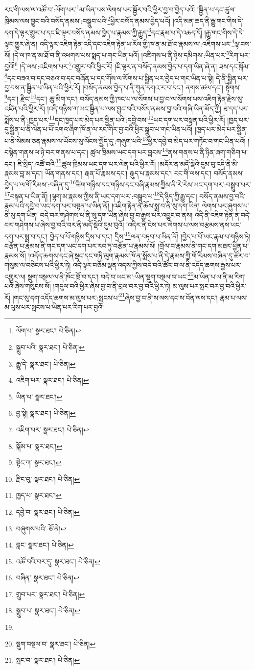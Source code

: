 རང་གི་ལས་ལ་འཚོ་བ་:ལོག་པར་\footnote{ལོག་པ་  སྣར་ཐང་།  པེ་ཅིན། }མ་ཡིན་པས་ལེགས་པར་སྦྱོར་བའི་ཕྱིར་བྱ་བ་བྱེད་པའོ། །སྦྱིན་པ་དང་ཚུལ་ཁྲིམས་ལས་བྱུང་བའི་བསོད་ནམས་:བསྒྲུབ་པའི་\footnote{སྒྲུབ་པའི་  སྣར་ཐང་།  པེ་ཅིན། }ཕྱིར་བསོད་ནམས་བྱེད་པའོ། །འདི་མན་ཆད་ནི་རྒྱུ་གང་གིས་དེ་དག་དེ་ལྟར་གྱུར་པ་དང་ཇི་ལྟར་བསོད་ནམས་བྱེད་པ་རྣམས་ཀྱི་རྒྱུད་\footnote{རྒྱུ་དེ་  སྣར་ཐང་།  པེ་ཅིན། }དང་རྣམ་པ་དེ་འཆད་དོ། །རྒྱུ་གང་གིས་དེ་དེ་ལྟར་གྱུར་ཞེ་ན། འདི་ལྟར་འཇིག་རྟེན་འདི་དང་འཇིག་རྟེན་ཕ་རོལ་གྱི་ཁ་ན་མ་ཐོ་བ་རྣམས་ལ་:འཇིགས་པར་\footnote{འཇིག་པར་  སྣར་ཐང་།  པེ་ཅིན། }ལྟ་བས་སོ། །དེ་ལ་ཁ་ན་མ་ཐོ་བ་ནི་འཕགས་པས་སྨད་པ་གང་ཡིན་པའོ། །འཇིགས་པ་ནི་ཉེས་དམིགས་:ཡིན་པར་\footnote{ཡིན་པ་  སྣར་ཐང་། }རིག་པར་བྱའོ།\footnote{བྱ་སྟེ།  སྣར་ཐང་།  པེ་ཅིན། } །དེ་ལས་:འཇིགས་པར་\footnote{འཇིག་པར་  སྣར་ཐང་།  པེ་ཅིན། }འགྱུར་བའི་ཕྱིར་རོ། །ཇི་ལྟར་ན་བསོད་ནམས་བྱེད་པ་དག་ཡིན་ཞེ་ན། ཟས་དང་སྐོམ་\footnote{སྐོམ་པ་  སྣར་ཐང་། }དང་བཟའ་བ་དང་བཅའ་བ་དང་བཞོན་པ་དང་གོས་ལ་སོགས་པ་སྦྱིན་པར་བྱེད་པ་གང་ཡིན་པ་སྟེ། དེ་ནི་སྦྱིན་པར་བྱ་བས་ན་སྦྱིན་པ་ཡིན་པའི་ཕྱིར་རོ། །བསོད་ནམས་བྱེད་པ་ནི་ཀུན་དགའ་ར་བ་དང་། ནགས་ཚལ་དང་། སྟེགས་\footnote{སྟེང་ཀ་  སྣར་ཐང་། }དང་། རྫིང་\footnote{རྫིང་བུ་  སྣར་ཐང་།  པེ་ཅིན། }དང་། ཆུ་མིག་དང་། བསོད་ནམས་ཀྱི་ཁང་པ་ལ་སོགས་པ་བྱ་བ་ལ་སོགས་པས་འཇིག་རྟེན་རྗེས་སུ་འཛིན་པའི་ཕྱིར་རོ། །འདི་གཉིས་ཀ་ཡང་སྦྱིན་པ་ལས་བྱུང་བའི་བསོད་ནམས་བྱ་བའི་གཞི་ཡིན་མོད་ཀྱི། ཐ་དད་པར་སྨོས་པ་ནི་:ཁྱད་པར་\footnote{ཁྱད་པ་  སྣར་ཐང་། }དང་ཁྱད་པར་མེད་པར་སྦྱིན་པའི་:དབྱེ་བས་\footnote{དབྱེ་བ་  སྣར་ཐང་།  པེ་ཅིན། }ཡང་དག་པར་བསྟན་པའི་ཕྱིར་རོ། །ཁྱད་པར་དུ་སྦྱིན་པ་ནི་ལེན་པ་པོ་འགའ་ཞིག་ཁོ་ན་ལ་རང་གིར་བྱ་བའི་ཕྱིར་སྒྲུབ་པ་གང་ཡིན་པའོ། །ཁྱད་པར་མེད་པར་སྦྱིན་པ་ནི་སེམས་ཅན་རྣམས་ལ་ཡོངས་སུ་ལོངས་སྤྱོད་དུ་:གཞུག་པའི་\footnote{བཞུགས་པའི་  ཅོ་ནེ། }ཕྱིར་དབྱེ་བ་མེད་པར་གཏོང་བ་གང་ཡིན་པའོ། །བསྙེན་གནས་ལ་ཉེ་བར་གནས་པ་དང་། ཚུལ་ཁྲིམས་ཡང་དག་པར་བླངས་\footnote{བླང་  སྣར་ཐང་།  པེ་ཅིན། }ནས་གནས་པ་ནི་ཉིན་ཞག་གཅིག་པ་དང་། ཇི་སྲིད་:འཚོ་བའི་\footnote{འཚོ་བའི་བར་དུ་  སྣར་ཐང་།  པེ་ཅིན། }ཚུལ་ཁྲིམས་ཡང་དག་པར་ལེན་པའི་ཕྱིར་རོ། །མདོར་ན་མདོ་སྡེའི་དུམ་བུ་འདི་ནི་མི་རྣམས་བླ་མ་དང་། ཡོན་གནས་དང་། རྒན་པོ་རྣམས་དང་། རྒུད་པ་རྣམས་དང་། རང་གི་ལས་དང་། བསོད་ནམས་བྱེད་པ་ལ་གོ་རིམས་:བཞིན་དུ་\footnote{བཞིན་  སྣར་ཐང་།  པེ་ཅིན། }ཚིག་གཉིས་དང་གཉིས་དང་བཞི་རྣམས་ཀྱིས་ནི་རེ་རེས་ཡང་དག་པར་:བསྒྲུབ་པར་\footnote{གྲུབ་པར་  སྣར་ཐང་།  པེ་ཅིན། }བསྟན་པ་ཡིན་ནོ། །ལྷག་མ་རྣམས་ཀྱིས་ནི་ཡང་དག་པར་:བསྒྲུབ་པ་\footnote{སྒྲུབ་པ་  སྣར་ཐང་།  པེ་ཅིན། }དེ་ཉིད་ཀྱི་རྒྱུ་དང་། བསོད་ནམས་བྱ་བའི་རྣམ་པའི་དབྱེ་བ་ཡང་དག་པར་བསྟན་པ་ཡིན་ནོ། །འཇིག་རྟེན་ན་ཆོས་སྨྲ་བ་ནི་སུ་དག་ཡིན། ལེགས་པར་ཞུགས་པ་ནི་སུ་དག་ཡིན། བདེ་བར་གཤེགས་པ་ནི་སུ་དག་ཡིན་ཞེས་བྱ་བ་རྒྱས་པར་འབྱུང་བ་ནས། འདི་ནི་འཇིག་རྟེན་ན་བདེ་བར་གཤེགས་པ་ཞེས་བྱ་བའི་བར་ནི་མདོ་སྡེའི་དུམ་བུའོ། །འདིར་ནི་ངེས་པར་ལེགས་པ་ལས་བརྩམས་ནས་ཡང་དག་པར་སྨྲ་བ་དང་། བྱེད་པ་པོ་གཉིས་དྲིས་པ་དང་། དྲིས་\footnote{}ལན་བཏབ་པ་ཡིན་ནོ། །བྱེད་པ་པོ་ཡང་རྣམ་པ་གཉིས་ཏེ། བརྩོན་པ་རྣམས་ནི་གང་དག་ཡང་དག་པར་རབ་ཏུ་བརྩོན་པ་རྣམས་སོ། །གྲོལ་བ་རྣམས་ནི་གང་དག་མཐར་ཕྱིན་པ་རྣམས་སོ། །འདོད་ཆགས་དང་ཞེ་སྡང་དང་གཏི་མུག་རྣམས་ཁོ་ན་སྨོས་པ་ནི་དེ་རྣམས་ཀྱི་གོ་རིམས་བཞིན་དུ་ཚོར་བ་གསུམ་ལ་བཅིངས་པའི་ཕྱིར་ཏེ། འདི་ལྟར་བཅོམ་ལྡན་འདས་ཀྱིས་བདེ་བའི་ཚོར་བ་ལ་ནི་འདོད་ཆགས་རྒྱས་པར་འགྱུར་ལ། སྡུག་བསྔལ་ལ་ནི་ཁོང་ཁྲོ་བ་དང་། བདེ་བ་ཡང་མ་:ཡིན་སྡུག་བསྔལ་བ་ཡང་\footnote{སྡུག་བསྔལ་བ་  སྣར་ཐང་།  པེ་ཅིན། }མ་ཡིན་པ་ལ་ནི་མ་རིག་པའོ་ཞེས་གསུངས་སོ། །གདུལ་བའི་ཕྱིར་ཞེས་བྱ་བ་ནི་བྲལ་བར་བྱ་བའི་ཕྱིར་ཏེ། མ་ལུས་པར་སྤང་བར་བྱ་བའི་ཕྱིར་རོ། །གང་སུ་དག་འདོད་ཆགས་མ་ལུས་པར་:སྤངས་པ་\footnote{སྤང་བ་  སྣར་ཐང་།  པེ་ཅིན། }ཞེས་བྱ་བ་ནི་ས་ལས་དང་ས་བོན་ལས་དང་། རྣམ་པ་ལས་མ་ལུས་པར་སྤངས་པ་ཡིན་པར་རིག་པར་བྱའོ། 